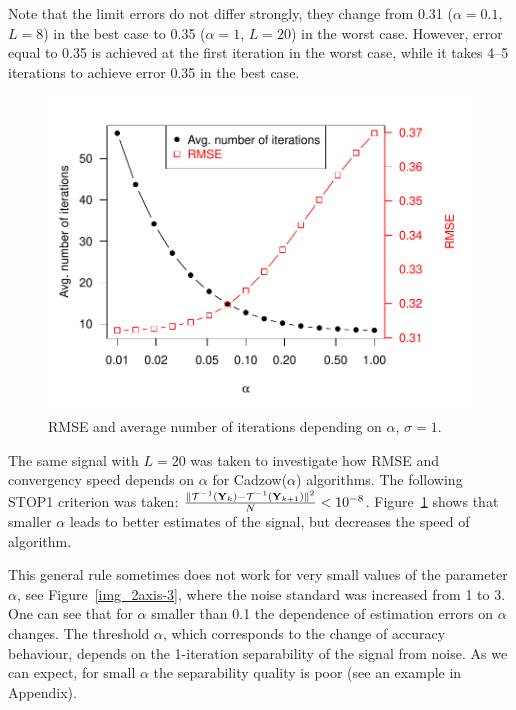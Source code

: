 \documentclass[sii]{ipart}
\begin{document}
Note that the limit errors do not differ strongly, they change from 0.31 ($\alpha=0.1$, $L=8$) in the best case to 0.35 ($\alpha=1$, $L=20$) in the worst case. However, error equal to 0.35 is achieved at the first iteration in the worst case, while it takes 4--5 iterations to achieve error 0.35 in the best case.

\smallskip
\begin{figure}[!hhh]
	\includegraphics[width = \columnwidth]{2axis.pdf}
	\caption{RMSE and average number of iterations depending on $\alpha$, $\sigma=1$.}
	\label{img_2axis}
\end{figure}
The same signal with $L = 20$ was taken to investigate how RMSE and convergency speed depends on $\alpha$ for Cadzow($\alpha$) algorithms. The following STOP1 criterion was taken: $\frac{\|\mathcal{T}^{-1}(\mathbf{Y}_k) - \mathcal{T}^{-1}(\mathbf{Y}_{k + 1})\|^2}{N} < 10^{-8}$. Figure~\ref{img_2axis} shows that smaller $\alpha$ leads to better estimates of the signal, but decreases the speed of algorithm.

This general rule sometimes does not work for very small values of the parameter $\alpha$, see Figure~\ref{img_2axis-3}, where
the noise standard was increased from 1 to 3. One can see that for $\alpha$ smaller than 0.1 the dependence of estimation errors on $\alpha$
changes.
The threshold $\alpha$, which corresponds to the change of accuracy behaviour, depends on the 1-iteration separability of the signal from noise.
As we can expect, for small $\alpha$ the separability quality is poor (see an example in Appendix).
\end{document}
